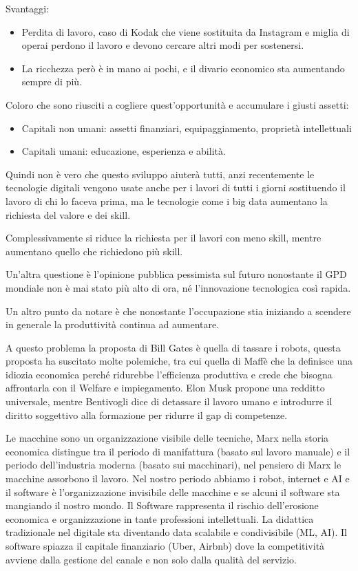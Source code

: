 \documentclass[]{article}
\begin{document}
Svantaggi:

\begin{itemize}
	 
	\item
	Perdita di lavoro, caso di Kodak che viene sostituita da Instagram e
	miglia di operai perdono il lavoro e devono cercare altri modi per
	sostenersi.
	\item
	La ricchezza però è in mano ai pochi, e il divario economico sta
	aumentando sempre di più.
\end{itemize}

Coloro che sono riusciti a cogliere quest'opportunità e accumulare i
giusti assetti:

\begin{itemize}
	 
	\item
	Capitali non umani: assetti finanziari, equipaggiamento, proprietà
	intellettuali
	\item
	Capitali umani: educazione, esperienza e abilità.
\end{itemize}

Quindi non è vero che questo sviluppo aiuterà tutti, anzi recentemente
le tecnologie digitali vengono usate anche per i lavori di tutti i
giorni sostituendo il lavoro di chi lo faceva prima, ma le tecnologie
come i big data aumentano la richiesta del valore e dei skill.

Complessivamente si riduce la richiesta per il lavori con meno skill,
mentre aumentano quello che richiedono più skill.

Un'altra questione è l'opinione pubblica pessimista sul futuro
nonostante il GPD mondiale non è mai stato più alto di ora, né
l'innovazione tecnologica così rapida.

Un altro punto da notare è che nonostante l'occupazione stia iniziando a
scendere in generale la produttività continua ad aumentare.

A questo problema la proposta di Bill Gates è quella di tassare i
robots, questa proposta ha suscitato molte polemiche, tra cui quella di
Maffè che la definisce una idiozia economica perché ridurebbe
l'efficienza produttiva e crede che bisogna affrontarla con il Welfare e
impiegamento. Elon Musk propone una redditto universale, mentre
Bentivogli dice di detassare il lavoro umano e introdurre il diritto
soggettivo alla formazione per ridurre il gap di competenze.

Le macchine sono un organizzazione visibile delle tecniche, Marx nella
storia economica distingue tra il periodo di manifattura (basato sul
lavoro manuale) e il periodo dell'industria moderna (basato sui
macchinari), nel pensiero di Marx le macchine assorbono il lavoro. Nel
nostro periodo abbiamo i robot, internet e AI e il software è
l'organizzazione invisibile delle macchine e se alcuni il software sta
mangiando il nostro mondo. Il Software rappresenta il rischio
dell'erosione economica e organizzazione in tante professioni
intellettuali. La didattica tradizionale nel digitale sta diventando
data scalabile e condivisibile (ML, AI). Il software spiazza il capitale
finanziario (Uber, Airbnb) dove la competitività avviene dalla gestione
del canale e non solo dalla qualità del servizio.
\end{document}
